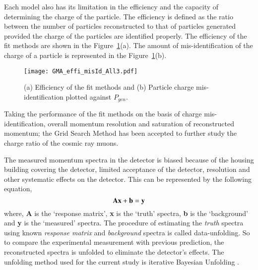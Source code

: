 Each model also has its limitation in the efficiency and the capacity of
determining the charge of the particle. The efficiency is defined as
the ratio between the number of particles reconstructed to that of
particles generated provided the charge of the particles are identified
properly. The efficiency of the fit methods are shown in the
Figure~\ref{fig:miseffi}(a).
The amount of mis-identification of the charge of a particle
is represented in the Figure~\ref{fig:miseffi}(b).
\begin{figure}[h]
  \centering
  \texttt{[image: GMA\_effi\_misId\_All3.pdf]}
  \caption{(a) Efficiency of the fit methods and (b) Particle charge
    mis-identification plotted against $P_{gen}$.}
  \label{fig:miseffi}
\end{figure}

Taking the performance of the fit methods on the basis of charge
mis-identification, overall momentum resolution and saturation of
reconstructed momentum; the Grid Search Method has been
accepted to further study the charge ratio of the cosmic ray muons.

The measured momentum spectra in the detector is biased
because of the housing building covering the detector, limited
acceptance of the detector, resolution and other systematic effects
on the detector. This can be represented by the following equation,
\begin{equation}
  {\bf A}{\bf x}+{\bf b}={\bf y}
  \label{eq:unfold}
\end{equation}
where, {\bf A} is the `response matrix', {\bf x} is the `truth' spectra,
{\bf b} is the `background' and {\bf y} is the `measured' spectra.
The procedure of estimating the {\it truth} spectra using known
{\it response matrix} and {\it background} spectra is called
data-unfolding. So to compare the experimental measurement with
previous prediction, the reconstructed spectra is unfolded to eliminate
the detector's effects.
The unfolding method used for the current
study is iterative Bayesian Unfolding \cite{bayesian}.


